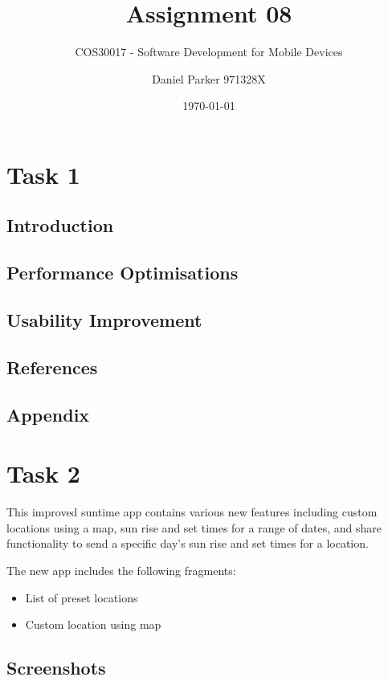 \documentclass[11pt,english,numbers=endperiod,parskip=half]{scrartcl}
\title{Assignment 08}
\subtitle{COS30017 - Software Development for Mobile Devices}
\author{Daniel Parker 971328X}
\date{\today}
\begin{document}
\maketitle
\thispagestyle{empty}

\section{Task 1}
\subsection{Introduction}
\subsection{Performance Optimisations}
\subsection{Usability Improvement}
\subsection{References}
\subsection{Appendix}

\section{Task 2}
This improved suntime app contains various new features including custom locations
using a map, sun rise and set times for a range of dates, and share functionality
to send a specific day's sun rise and set times for a location.

The new app includes the following fragments:
\begin{itemize}
	\item{List of preset locations}
	\item{Custom location using map}
\end{itemize}

\subsection{Screenshots}
\setlength\fboxsep{0pt}
\setlength\fboxrule{0.5pt}
\end{document}
